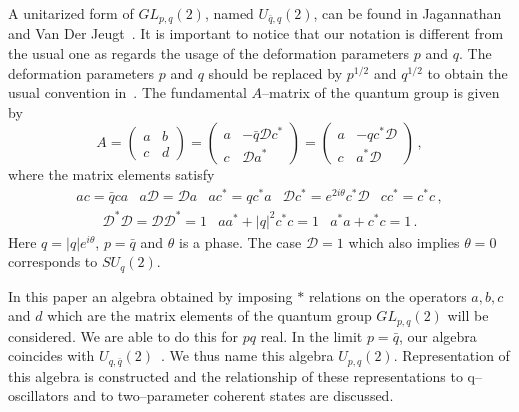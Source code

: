 \documentclass[a4paper,12pt]{article}
\numberwithin{equation}{section}
\begin{document}
A unitarized form of $GL_{p,q}\left( 2 \right)$, named $U_{\bar q,q}\left(2\right)$,
 can be found in Jagannathan and Van Der Jeugt~\cite{Jag}.
It is important to notice that our notation is different from the usual one as regards the usage of the deformation parameters $p$ and $q$.
The deformation parameters $p$ and $q$ should be replaced by $p^{1/2}$ and $q^{1/2}$ to obtain the usual convention in~\cite{Jag}.
The fundamental $A$--matrix of the quantum group is given by
\begin{equation}\label{uqbq}
A = \left(
\begin{array}{cc}
a & b \\
c & d
\end{array}
\right) = \left(
\begin{array}{cc}
a & - \bar q \mathcal{D} c^\ast \\
c & \mathcal{D} a^\ast
\end{array} \right) = \left(
\begin{array}{cc}
a & -q c^\ast \mathcal{D} \\
c & a^\ast \mathcal{D}
\end{array}
\right) \, ,
\end{equation}
where the matrix elements satisfy
\[
\begin{array}{ccccc}
a c = \bar q c a & a \mathcal{D} = \mathcal{D} a & a c^\ast = q c^\ast a &
\mathcal{D} c^\ast = e^{2 i \theta } c^\ast \mathcal{D} & c c^\ast = c^\ast
c \, ,
\end{array}
\]
\begin{equation}
\begin{array}{ccc}
\mathcal{D}^\ast \mathcal{D} = \mathcal{D} \mathcal{D}^\ast = 1 & a a^\ast + \left| q
\right|^2 c^\ast c = 1 & a^\ast a + c^\ast c = 1 \, .
\end{array}
\end{equation}
Here $q = \left| q \right| e^{i \theta}$, $p = \bar q$  and
 $\theta$ is a phase. The case $\mathcal{D} = 1$ which also implies
 $\theta = 0$ corresponds to $SU_q \left( 2 \right)$.

In this paper an algebra obtained by imposing $\ast$ relations on the operators $a,b,c$ and $d$ which are the matrix elements
 of the quantum group $GL_{p,q}\left(2\right)$ will be considered.
We are able to do this for $pq$ real. In the limit $p = \bar q$, our algebra coincides with $U_{q,\bar q}\left( 2 \right)$~\cite{Jag}.
We thus name this algebra $U_{p,q}\left(2\right)$. Representation of this algebra is constructed and the relationship of
 these representations to q--oscillators and to two--parameter coherent states are discussed.
\end{document}
